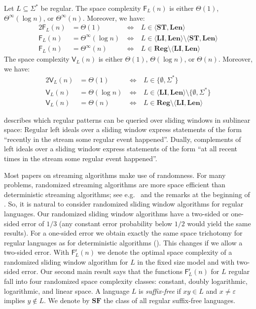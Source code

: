 \documentclass{theoretics}
\newcommand{\F}{\mathsf{F}}
\newcommand{\V}{\mathsf{V}}
\renewcommand{\r}{\mathsf{r}}
\newcommand{\Reg}{\mathbf{Reg}}
\newcommand{\Len}{\mathbf{Len}}
\newcommand{\LI}{\mathbf{LI}}
\newcommand{\ST}{\mathbf{ST}}
\newcommand{\SF}{\mathbf{SF}}
\newcommand{\eps}{\varepsilon}
\newcommand{\Thetainf}{\Theta^{\scriptscriptstyle{\infty}}}
\begin{document}
\begin{theorem}
	\label{thm:big-thm}
	Let $L \subseteq \Sigma^*$ be regular.
	The space complexity
	$\F_L(n)$ is either $\Theta(1)$, $\Thetainf(\log n)$, or $\Thetainf(n)$. Moreover, we have:
	\begin{alignat*}{2}
	\F_L(n) &= \Theta(1) & \ \iff \ & L \in \langle \ST, \Len \rangle \\
	\F_L(n) &= \Thetainf(\log n) & \ \iff \ & L \in \langle \LI, \Len \rangle \setminus \langle \ST, \Len \rangle \\
	\F_L(n) &= \Thetainf(n) & \ \iff \ & L \in \Reg  \setminus \langle \LI, \Len \rangle 
	\end{alignat*}
	The space complexity 
	$\V_L(n)$ is either $\Theta(1)$, $\Theta(\log n)$, or $\Theta(n)$. Moreover, we have:
	\begin{alignat*}{2}
	\V_L(n) &= \Theta(1) & \ \iff \ & L \in \{\emptyset, \Sigma^*\} \\
	\V_L(n) &= \Theta(\log n) & \ \iff \ & L \in \langle \LI, \Len \rangle \setminus \{\emptyset, \Sigma^*\} \\
	\V_L(n) &= \Theta(n) & \ \iff \ & L \in \Reg  \setminus \langle \LI, \Len \rangle
	\end{alignat*}
	\end{theorem}

 describes which regular patterns can be queried over sliding windows in sublinear space:
Regular left ideals over a sliding window express statements of the form ``recently in the stream some regular event happened''.
Dually, complements of left ideals over a sliding window express statements of the form
``at all recent times in the stream some regular event happened''.

Most papers on streaming algorithms make use of randomness. For many problems, randomized
streaming algorithms are more space efficient than deterministic streaming algorithms; see e.g.~\cite{AlonMS99}
and the remarks at the beginning of .
So, it is natural to consider
randomized sliding window algorithms for regular languages. 
Our randomized sliding window algorithms have a two-sided or one-sided error of $1/3$ (any constant error probability below $1/2$ would yield the same results).
For a one-sided error we obtain exactly the same space trichotomy for regular languages 
as for deterministic algorithms (). This changes if we allow a two-sided error.
With $\F^\r_L(n)$ we denote the optimal space complexity of a randomized
sliding window algorithm for $L$ in the fixed size model and with two-sided error. Our second main result says 
that the functions $\F^\r_L(n)$ for $L$ regular fall into four randomized space complexity classes:
constant, doubly logarithmic, logarithmic, and linear space.
A language $L$ is {\em suffix-free} if $xy \in L$ and $x \neq \eps$ implies $y \notin L$.
We denote by $\SF$ the class of all regular suffix-free languages.
\end{document}
